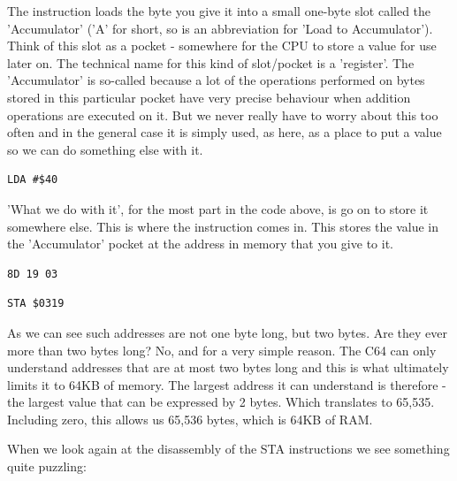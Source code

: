 The instruction  loads the byte you give it into a small one-byte slot called the 'Accumulator' ('A' for short,
so  is an abbreviation for 'Load to Accumulator'). Think of this slot
as a pocket - somewhere for the CPU to store a value for use later on. The technical name for this kind of 
slot/pocket is a 'register'. The 'Accumulator' is so-called because a lot of the operations performed on
bytes stored in this particular pocket have very precise behaviour when addition operations are executed on
it. But we never really have to worry about this too often and in the general case it is simply used, as
here, as a place to put a value so we can do something else with it.
\clearpage

\begin{lstlisting}[caption=Loading the byte \$40 to the \icode{Accumulator}.,escapechar=\%]
LDA #$40
\end{lstlisting}

'What we do with it', for the most part in the code above, is go on to store it somewhere else. This is where
the  instruction comes in. This stores the value in the 'Accumulator' pocket at the address
in memory that you give to it. 

\begin{minipage}[b]{0.45\linewidth}
\centering
\begin{lstlisting}[escapechar=\%]
8D 19 03
\end{lstlisting}
\end{minipage}
\hspace{0.5cm}
\begin{minipage}[b]{0.45\linewidth}
\centering
\begin{lstlisting}[escapechar=\%]
STA $0319
\end{lstlisting}
\end{minipage}

As we can see such addresses are not one byte long, but two bytes. Are they
ever more than two bytes long? No, and for a very simple reason. The C64 can only understand addresses
that are at most two bytes long and this is what ultimately limits it to 64KB of memory. The largest address it can understand
is therefore  - the largest value that can be expressed by 2 bytes. Which translates to 65,535.
Including zero, this allows us 65,536 bytes, which is 64KB of RAM. 

When we look again at the disassembly of the STA instructions we see something quite puzzling:

